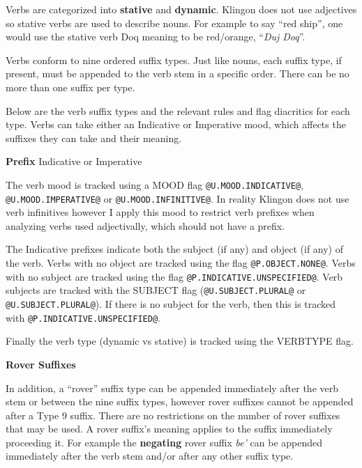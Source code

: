 \documentclass[11pt]{article}
\begin{document}
Verbs are categorized into \textbf{stative} and \textbf{dynamic}. Klingon does not use adjectives so stative verbs are used to describe nouns. For example to say ``red ship'', one would use the stative verb Doq meaning to be red/orange, ``\textit{Duj Doq}''.

Verbs conform to nine ordered suffix types. Just like nouns, each suffix type, if present, must be appended to the verb stem in a specific order. There can be no more than one suffix per type.

Below are the verb suffix types and the relevant rules and flag diacritics for each type. Verbs can take either an Indicative or Imperative mood, which affects the suffixes they can take and their meaning.

\textbf{Prefix} Indicative or Imperative

The verb mood is tracked using a MOOD flag \texttt{@U.MOOD.INDICATIVE@}, \texttt{@U.MOOD.IMPERATIVE@} or \texttt{@U.MOOD.INFINITIVE@}. In reality Klingon does not use verb infinitives however I apply this mood to restrict verb prefixes when analyzing verbs used adjectivally, which should not have a prefix.

The Indicative prefixes indicate both the subject (if any) and object (if any) of the verb. Verbs with no object are tracked using the flag \texttt{@P.OBJECT.NONE@}. Verbs with no subject are tracked using the flag \texttt{@P.INDICATIVE.UNSPECIFIED@}. Verb subjects are tracked with the SUBJECT flag (\texttt{@U.SUBJECT.PLURAL@} or \texttt{@U.SUBJECT.PLURAL@}). If there is no subject for the verb, then this is tracked with \texttt{@P.INDICATIVE.UNSPECIFIED@}.

Finally the verb type (dynamic vs stative) is tracked using the VERBTYPE flag.

\textbf{Rover Suffixes}

In addition, a ``rover'' suffix type can be appended immediately after the verb stem or between the nine suffix types, however rover suffixes cannot be appended after a Type 9 suffix. There are no restrictions on the number of rover suffixes that may be used. A rover suffix's meaning applies to the suffix immediately proceeding it. For example the \textbf{negating} rover suffix \textit{be'} can be appended immediately after the verb stem and/or after any other suffix type.
\end{document}
